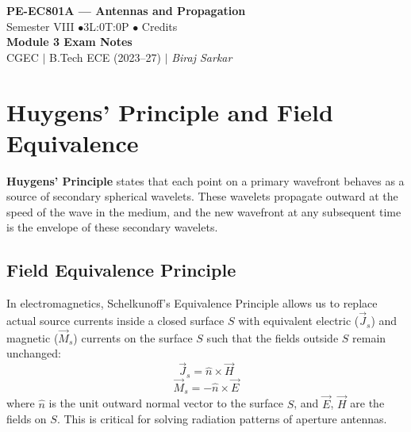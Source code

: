 \documentclass[12pt,a4paper]{article}
\begin{document}

\begin{center}
  {\LARGE\bfseries\color{myred} PE-EC801A --- Antennas and Propagation}\\[5pt]
  {\normalsize\color{mydark} Semester VIII \quad$\bullet$\quad 3L:0T:0P \quad$\bullet$ Credits}\\[3pt]
  {\normalsize\color{myteal}\textbf{Module 3 Exam Notes}}\\[3pt]
  {\small\color{mydark} CGEC \;$|$\; B.Tech ECE (2023--27) \;$|$\; \textit{Biraj Sarkar}}
\end{center}
\vspace{2pt}
\noindent{\color{myred}\rule{\linewidth}{1.5pt}}
\vspace{2pt}

\hypersetup{linkcolor=mydark}
\tableofcontents
\hypersetup{linkcolor=myteal}
\newpage

\section{Huygens' Principle and Field Equivalence}

\begin{tcolorbox}[defbox, title={\textbf{Huygens' Principle}}]
\textbf{Huygens' Principle} states that each point on a primary wavefront behaves as a source of secondary spherical wavelets. These wavelets propagate outward at the speed of the wave in the medium, and the new wavefront at any subsequent time is the envelope of these secondary wavelets.
\end{tcolorbox}

\subsection{Field Equivalence Principle}
In electromagnetics, Schelkunoff's Equivalence Principle allows us to replace actual source currents inside a closed surface $S$ with equivalent electric ($\vec{J}_s$) and magnetic ($\vec{M}_s$) currents on the surface $S$ such that the fields outside $S$ remain unchanged:
\[
\vec{J}_s = \hat{n} \times \vec{H}
\]
\[
\vec{M}_s = -\hat{n} \times \vec{E}
\]
where $\hat{n}$ is the unit outward normal vector to the surface $S$, and $\vec{E}$, $\vec{H}$ are the fields on $S$. This is critical for solving radiation patterns of aperture antennas.
\end{document}
